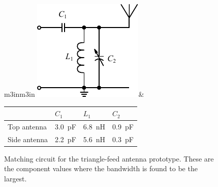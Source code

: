 \begin{figure}[htbp]
        \centering
        \begin{tabular}{m{3in}m{3in}}
            \centering
            \includegraphics{img/tech_sol/schematic_tuning_1}&
            \centering
            \footnotesize
            \begin{tabular}{|l|l|l|l|}
                \hline
                & $C_1$ & $L_1$ & $C_2$ \\
                \hline
                Top antenna & \SI{3.0}{pF} & \SI{6.8}{nH} & \SI{0.9}{pF} \\
                Side antenna & \SI{2.2}{pF} & \SI{5.6}{nH} & \SI{0.3}{pF} \\
                \hline
            \end{tabular}
        \end{tabular}
    \caption{Matching circuit for the triangle-feed antenna prototype. These are the component values where the bandwidth is found to be the largest.}
    \label{fig:triang_proto_matching}
\end{figure}


